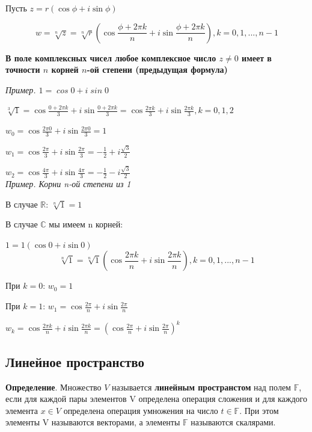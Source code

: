 \documentclass[a4paper]{article}
\begin{document}
    Пусть $z = r(\cos \phi + i \sin \phi)$

    \begin{equation}
        \displaystyle w = \sqrt[n]{z} = \sqrt[n]{r} \left( \cos \frac{\phi + 2\pi k}{n} + i \sin \frac{\phi + 2\pi k}{n} \right), k = 0,1,...,n-1
    \end{equation}

    \textbf{В поле комплексных чисел любое комплексное число $z \neq 0$ имеет в точности $n$ корней $n$-ой степени (предыдущая формула)}

    \textit{Пример. $\mathit{1 = \cos 0 + i \sin 0}$}

    $\displaystyle \sqrt[3]{1} = \cos \frac{0+2\pi k}{3} + i \sin \frac{0 + 2\pi k}{3} = \cos \frac{2 \pi k}{3} + i \sin \frac{2 \pi k}{3}, k = 0,1,2$

    $\displaystyle w_0 = \cos \frac{2 \pi 0}{3} + i \sin \frac{2 \pi 0}{3} = 1$

    $\displaystyle w_1 = \cos \frac{2 \pi}{3} + i \sin \frac{2 \pi}{3} = -\frac{1}{2} + i\frac{\sqrt{3}}{2}$

    $\displaystyle w_2 = \cos \frac{4 \pi}{3} + i \sin \frac{4 \pi}{3} = -\frac{1}{2} - i\frac{\sqrt{3}}{2}$\\

    \textit{Пример. Корни n-ой степени из 1}

    В случае $\mathbb{R}$: $\sqrt[n]{1} = 1$

    В случае $\mathbb{C}$ мы имеем n корней:

    $1 = 1(\cos 0 + i \sin 0)$
    \begin{equation}
        \displaystyle \sqrt[n]{1} = \sqrt[n]{1} \left( \cos \frac{2\pi k}{n} + i \sin \frac{2 \pi k}{n} \right), k=0,1,...,n-1
    \end{equation}


    При $k=0$: $w_0 = 1$

    При $k=1$: $\displaystyle w_1 = \cos \frac{2\pi}{n} + i \sin \frac{2\pi}{n}$

    $\displaystyle w_k = \cos \frac{2\pi k}{n} + i \sin \frac{2 \pi k}{n} = \left( \cos \frac{2\pi}{n} + i \sin \frac{2 \pi}{n} \right)^k$


    \newpage \begin{center}
                 \begin{Large}
                 \end{Large}
    \end{center}
    \subsection*{Линейное пространство}
    \textbf{Определение}. Множество $V$ называется \textbf{линейным пространстом} над полем $\mathbb{F}$, если для каждой пары элементов V определена операция сложения и для каждого элемента $x \in V$ определена операция умножения на число $t \in \mathbb{F}$. При этом элементы V называются векторами, а элементы $\mathbb{F}$ называются скалярами.
\end{document}
